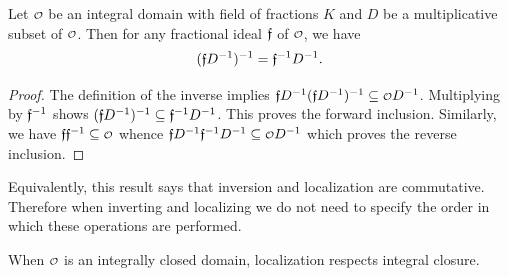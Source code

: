     \begin{proposition}\label{prop:inverse_of_localization_is_localization_of_inverse}
      Let \(\smc{O}\) be an integral domain with field of fractions \(K\) and \(D\) be a multiplicative subset of \(\smc{O}\). Then for any fractional ideal \(\mathfrak{f}\) of \(\smc{O}\), we have
      \[
        (\mathfrak{f}D^{-1})^{-1} = \mathfrak{f}^{-1}D^{-1}.
      \]
    \end{proposition}
    \begin{proof}
      The definition of the inverse implies \(\mf{f}D^{-1}(\mf{f}D^{-1})^{-1} \subseteq \smc{O}D^{-1}\). Multiplying by \(\mathfrak{f}^{-1}\) shows \((\mathfrak{f}D^{-1})^{-1} \subseteq \mathfrak{f}^{-1}D^{-1}\). This proves the forward inclusion. Similarly, we have \(\mf{f}\mf{f}^{-1} \subseteq \smc{O}\) whence \(\mf{f}D^{-1}\mf{f}^{-1}D^{-1} \subseteq \smc{O}D^{-1}\) which proves the reverse inclusion.
    \end{proof}

    Equivalently, this result says that inversion and localization are commutative. Therefore when inverting and localizing we do not need to specify the order in which these operations are performed.

    When \(\smc{O}\) is an integrally closed domain, localization respects integral closure.

